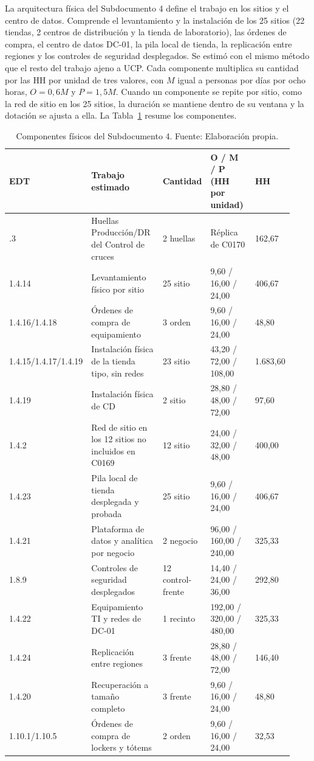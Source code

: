 \documentclass[11pt]{article}
\begin{document}
La arquitectura física del Subdocumento 4 define el trabajo en los sitios y el centro de datos. Comprende el levantamiento y la instalación de los 25 sitios (22 tiendas, 2 centros de distribución y la tienda de laboratorio), las órdenes de compra, el centro de datos DC-01, la pila local de tienda, la replicación entre regiones y los controles de seguridad desplegados. Se estimó con el mismo método que el resto del trabajo ajeno a UCP. Cada componente multiplica su cantidad por las HH por unidad de tres valores, con $M$ igual a personas por días por ocho horas, $O=0{,}6M$ y $P=1{,}5M$. Cuando un componente se repite por sitio, como la red de sitio en los 25 sitios, la duración se mantiene dentro de su ventana y la dotación se ajusta a ella. La Tabla~\ref{tab:t15-sd04} resume los componentes.

\begingroup
\small
\begin{longtable}{@{}p{0.13\linewidth}p{0.33\linewidth}p{0.14\linewidth}p{0.22\linewidth}p{0.11\linewidth}@{}}
\caption[Componentes físicos del Subdocumento 4]{Componentes físicos del Subdocumento 4. Fuente: Elaboración propia.}\label{tab:t15-sd04}\\
\toprule
\textbf{EDT} & \textbf{Trabajo estimado} & \textbf{Cantidad} & \textbf{O / M / P (HH por unidad)} & \textbf{HH} \\
\midrule
\endhead
\bottomrule
\endlastfoot
1.4.3 & Huellas Producción/DR del Control de cruces & 2 huellas & Réplica de C0170 & 162,67 \\
1.4.14 & Levantamiento físico por sitio & 25 sitio & 9,60 / 16,00 / 24,00 & 406,67 \\
1.4.16/1.4.18 & Órdenes de compra de equipamiento & 3 orden & 9,60 / 16,00 / 24,00 & 48,80 \\
1.4.15/1.4.17/1.4.19 & Instalación física de la tienda tipo, sin redes & 23 sitio & 43,20 / 72,00 / 108,00 & 1.683,60 \\
1.4.19 & Instalación física de CD & 2 sitio & 28,80 / 48,00 / 72,00 & 97,60 \\
1.4.2 & Red de sitio en los 12 sitios no incluidos en C0169 & 12 sitio & 24,00 / 32,00 / 48,00 & 400,00 \\
1.4.23 & Pila local de tienda desplegada y probada & 25 sitio & 9,60 / 16,00 / 24,00 & 406,67 \\
1.4.21 & Plataforma de datos y analítica por negocio & 2 negocio & 96,00 / 160,00 / 240,00 & 325,33 \\
1.8.9 & Controles de seguridad desplegados & 12 control-frente & 14,40 / 24,00 / 36,00 & 292,80 \\
1.4.22 & Equipamiento TI y redes de DC-01 & 1 recinto & 192,00 / 320,00 / 480,00 & 325,33 \\
1.4.24 & Replicación entre regiones & 3 frente & 28,80 / 48,00 / 72,00 & 146,40 \\
1.4.20 & Recuperación a tamaño completo & 3 frente & 9,60 / 16,00 / 24,00 & 48,80 \\
1.10.1/1.10.5 & Órdenes de compra de lockers y tótems & 2 orden & 9,60 / 16,00 / 24,00 & 32,53 \\
\end{longtable}
\endgroup
\end{document}
